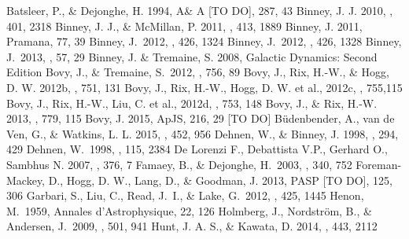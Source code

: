 \documentclass[12pt,preprint]{aastex}
\begin{document}
\begin{thebibliography}{}
 Batsleer, P., \& Dejonghe, H. 1994, A\& A [TO DO], 287, 43
 Binney, J. J. 2010, \mnras, 401, 2318
 Binney, J. J., \& McMillan, P. 2011, \mnras, 413, 1889
 Binney, J. 2011, Pramana, 77, 39
 Binney, J.\ 2012, \mnras, 426, 1324  %
 Binney, J.\ 2012, \mnras, 426, 1328  %
 Binney, J.\ 2013, \nar, 57, 29 
 Binney, J. \& Tremaine, S. 2008, Galactic Dynamics: Second Edition
 Bovy, J., \& Tremaine, S.\ 2012, \apj, 756, 89
 Bovy, J., Rix, H.-W., \& Hogg, D. W. 2012b, \apj, 751, 131
 Bovy, J., Rix, H.-W., Hogg, D. W. et al., 2012c, \apj, 755,115
 Bovy, J., Rix, H.-W., Liu, C. et al., 2012d, \apj, 753, 148
  Bovy, J., \& Rix, H.-W. 2013, \apj, 779, 115
 Bovy, J. 2015, ApJS, 216, 29 [TO DO]
 B\"{u}denbender, A., van de Ven, G., \& Watkins, L. L. 2015, \mnras, 452, 956
 Dehnen, W., \& Binney, J. 1998, \mnras, 294, 429
 Dehnen, W.\ 1998, \aj, 115, 
2384 
 De Lorenzi F., Debattista V.P., Gerhard O., Sambhus N. 2007, \mnras, 376, 7
 Famaey, B., \& Dejonghe, H.\ 2003, \mnras, 340, 752 
 Foreman-Mackey, D., Hogg, D. W., Lang, D., \& Goodman, J. 2013, PASP [TO DO], 125, 306
 Garbari, S., Liu, C., Read, J.~I., \& Lake, G.\ 2012, \mnras, 425, 1445 
 Henon, M.\ 1959, Annales d'Astrophysique, 22, 126 
 Holmberg, J., Nordstr{\"o}m, B., \& Andersen, J.\ 2009, \aap, 501, 941 
 Hunt, J. A. S., \& Kawata, D. 2014, \mnras, 443, 2112

\end{thebibliography}
\end{document}

